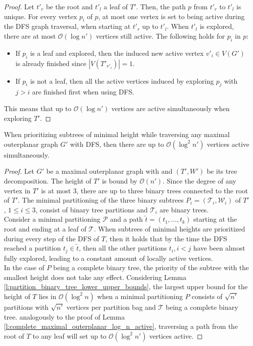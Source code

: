 \begin{proof}
	Let $t'_r$ be the root and $t'_l$ a leaf of $T'$. Then, the path $p$ from $t'_r$ to $t'_l$ is unique. For every vertex $p_i$ of $p$, at most one vertex is set to being active during the DFS graph traversal, when starting at $t'_r$ up to $t'_l$. When $t'_l$ is explored, there are at most $\mathcal{O}(\log n')$ vertices still active. 
	The following holds for $p_i$ in $p$:
	\begin{itemize}
		\item If $p_i$ is a leaf and explored, then the induced new active vertex $v'_i\in V(G')$ is already finished since $|V(T'_{v'_i})| = 1$.
		\item If $p_i$ is not a leaf, then all the active vertices induced by exploring $p_{j}$ with $j>i$ are finished first when using DFS.
	\end{itemize}
	This means that up to $\mathcal{O}(\log n')$ vertices are active simultaneously when exploring $T'$.
\end{proof}

\begin{lemma}
	When prioritizing subtrees of minimal height while traversing any maximal outerplanar graph $G'$ with DFS, then there are up to $\mathcal{O}(\log^2 n')$ vertices active simultaneously.\label{l:maximal_outerplanar_log2_n_vercies_active}
\end{lemma}

\begin{proof}
	Let $G'$ be a maximal outerplanar graph with and $(T',W')$ be its tree decomposition. The height of $T'$ is bound by $\mathcal{O}(n')$. Since the degree of any vertex in $T'$ is at most 3, there are up to three binary trees connected to the root of $T'$. The minimal partitioning of the three binary subtrees $P_i = (\mathcal{T}_i,\mathcal{W}_i)$ of $T'$, $1\leq i \leq 3$, consist of binary tree partitions and $\mathcal{T}_i$ are binary trees.\\
	Consider a minimal partitioning $\mathcal{P}$ and a path $\tilde{t} = (t_1,...,t_k)$ starting at the root and ending at a leaf of $\mathcal{T}$. When subtrees of minimal heights are prioritized during every step of the DFS of $T$, then it holds that by the time the DFS reached a partition $t_j \in \tilde{t}$, then all the other partitions $t_i, i<j$ have been almost fully explored, leading to a constant amount of locally active vertices.\\
	In the case of $P$ being a complete binary tree, the priority of the subtree with the smallest height does not take any effect. Considering Lemma \ref{l:partition_binary_tree_lower_upper_bounds}, the largest upper bound for the height of $T$ lies in $\mathcal{O}(\log^2 n)$ when a minimal partitioning $P$ consists of $\sqrt{n'}$ partitions with $\sqrt{n'}$ vertices per partition bag and $\mathcal{T}$ being a complete binary tree. analogously to the proof of Lemma \ref{l:complete_maximal_outerplanar_log_n_active}, traversing a path from the root of $T$ to any leaf will set up to $\mathcal{O}(\log^2 n')$ vertices active.
\end{proof}

